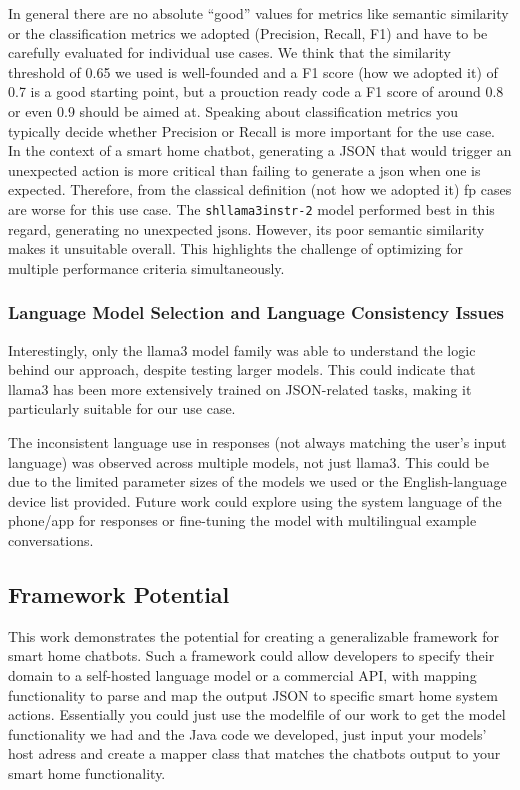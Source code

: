 In general there are no absolute ``good'' values for metrics like semantic similarity \cite{muhammad2022_similarity} or the classification metrics \cite{yacouby-axman-2020-probabilistic,dasExplainableActivityRecognition2023} we adopted (Precision, Recall, F1) and have to be carefully evaluated for individual use cases.
We think that the similarity threshold of 0.65 we used is well-founded and a F1 score (how we adopted it) of 0.7 is a good starting point, but a prouction ready code a F1 score of around 0.8 or even 0.9 should be aimed at.
Speaking about classification metrics you typically decide whether Precision or Recall is more important for the use case. In the context of a smart home chatbot, generating a JSON that would trigger an unexpected action is more critical than failing to generate a \gls{json} when one is expected. Therefore, from the classical definition (not how we adopted it) \gls{fp} cases are worse for this use case.
The \texttt{shllama3instr-2} model performed best in this regard, generating no unexpected \glspl{json}. 
However, its poor semantic similarity makes it unsuitable overall. This highlights the challenge of optimizing for multiple performance criteria simultaneously.

\subsubsection{Language Model Selection and Language Consistency Issues}
Interestingly, only the llama3 model family was able to understand the logic behind our approach, despite testing larger models. This could indicate that llama3 has been more extensively trained on JSON-related tasks, making it particularly suitable for our use case.

The inconsistent language use in responses (not always matching the user's input language) was observed across multiple models, not just llama3. This could be due to the limited parameter sizes of the models we used or the English-language device list provided. Future work could explore using the system language of the phone/app for responses or fine-tuning the model with multilingual example conversations.

\subsection{Framework Potential}
This work demonstrates the potential for creating a generalizable framework for smart home chatbots. Such a framework could allow developers to specify their domain to a self-hosted language model or a commercial API, with mapping functionality to parse and map the output JSON to specific smart home system actions. Essentially you could just use the modelfile of our work to get the model functionality we had and the Java code we developed, just input your models' host adress and create a mapper class that matches the chatbots output to your smart home functionality.

